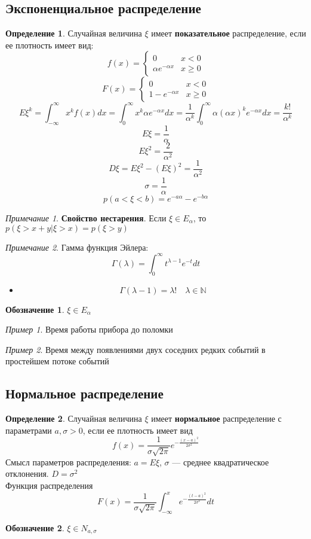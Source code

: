 \documentclass[english]{article}
\newcommand{\N}{\mathbb{N}}
\theoremstyle{plain}
\theoremstyle{remark}
\newtheorem*{remark}{Примечание}
\newtheorem*{examp}{Пример}
\theoremstyle{definition}
\newtheorem*{definition}{Определение}
\newtheorem*{symb}{Обозначение}
\begin{document}
\subsection{Экспоненциальное распределение}
\label{sec:org464a9d9}
\begin{definition}
Случайная величина \(\xi\) имеет \textbf{показательное} распределение, если ее плотность имеет вид:
\[ f(x) = \begin{cases}
0 & x < 0 \\
\alpha e^{- \alpha x} & x \ge 0
\end{cases}\]
\[ F(x) = \begin{cases}
0 & x < 0 \\
1 - e^{-\alpha x} & x \ge 0
\end{cases}\]
\[ E\xi^k = \int_{-\infty}^\infty x^k f(x) dx = \int_0^\infty x^k \alpha e^{-\alpha x} dx = \frac{1}{\alpha^k} \int_0^\infty \alpha (\alpha x)^ke^{-\alpha x} dx = \frac{k!}{\alpha^k} \]
\[ E\xi = \frac{1}{\alpha} \]
\[ E\xi^2 = \frac{2}{\alpha^2} \]
\[ D\xi = E\xi^2 - (E\xi)^2 = \frac{1}{\alpha^2} \]
\[ \sigma = \frac{1}{\alpha} \]
\[ p(a < \xi < b) = e^{-a\alpha} - e^{- b\alpha} \]
\end{definition}
\begin{remark}
\textbf{Свойство нестарения}. Если \(\xi \in E_\alpha\), то \(p(\xi > x + y | \xi > x) = p(\xi > y)\)
\end{remark}

\begin{remark}
Гамма функция Эйлера:
\[ \Gamma(\lambda) = \int_0^\infty t^{\lambda - 1} e^{-t} dt \]
\begin{itemize}
\item \[ \Gamma(\lambda - 1) = \lambda! \quad \lambda \in \N \]
\end{itemize}
\end{remark}
\begin{symb}
\(\xi \in E_\alpha\)
\end{symb}
\begin{examp}
Время работы прибора до поломки
\end{examp}
\begin{examp}
Время между появлениями двух соседних редких событий в простейшем потоке событий
\end{examp}
\subsection{Нормальное распределение}
\label{sec:org8b5dcee}
\begin{definition}
Случайная величина \(\xi\) имеет \textbf{нормальное} распределение с параметрами \(a, \sigma > 0\), если ее плотность имеет вид
\[ f(x) = \frac{1}{\sigma\sqrt{2\pi}}e^{-\frac{(x - a)^2}{2\sigma^2}}\]
Смысл параметров распределения: \(a = E\xi\), \(\sigma\) --- среднее квадратическое отклонения. \(D = \sigma^2\) \\
Функция распределения
\[ F(x) = \frac{1}{\sigma\sqrt{2\pi}} \int_{-\infty}^x e^{-\frac{(t - a)^2}{2\sigma^2}} dt \]
\end{definition}
\begin{symb}
\(\xi \in N_{a, \sigma}\)
\end{symb}
\end{document}
